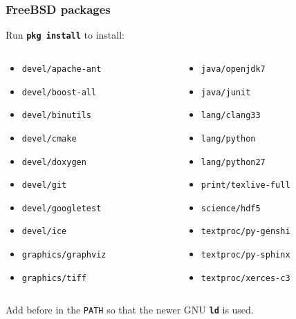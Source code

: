 \documentclass{beamer}
\newcommand{\cmd}[1]{\textbf{\texttt{#1}}}
\newcommand{\pkg}[1]{\texttt{#1}}
\newcommand{\env}[1]{\texttt{#1}}
\begin{document}
\begin{frame}
  \frametitle{FreeBSD packages}
  \scriptsize
  Run \cmd{pkg install} to install:
  \begin{columns}
    \begin{column}{.5\linewidth}
      \begin{itemize}
      \item[] \pkg{devel/apache-ant}
      \item[] \pkg{devel/boost-all}
      \item[] \pkg{devel/binutils}
      \item[] \pkg{devel/cmake}
      \item[] \pkg{devel/doxygen}
      \item[] \pkg{devel/git}
      \item[] \pkg{devel/googletest}
      \item[] \pkg{devel/ice}
      \item[] \pkg{graphics/graphviz}
      \item[] \pkg{graphics/tiff}
      \end{itemize}
      \end{column}
    \begin{column}{.5\linewidth}
    \begin{itemize}
      \item[] \pkg{java/openjdk7}
      \item[] \pkg{java/junit}
      \item[] \pkg{lang/clang33}
      \item[] \pkg{lang/python}
      \item[] \pkg{lang/python27}
      \item[] \pkg{print/texlive-full}
      \item[] \pkg{science/hdf5}
      \item[] \pkg{textproc/py-genshi}
      \item[] \pkg{textproc/py-sphinx}
      \item[] \pkg{textproc/xerces-c3}
    \end{itemize}
    \end{column}
  \end{columns}

  \bigskip
  Add  before  in the \env{PATH}
  so that the newer GNU \cmd{ld} is used.
\end{frame}
\end{document}
